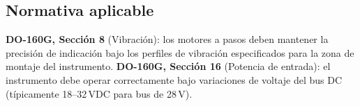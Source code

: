 \documentclass[11pt]{article}
\begin{document}
\subsection{Normativa aplicable}
\textbf{DO-160G, Sección 8} (Vibración): los motores a pasos deben mantener la precisión
de indicación bajo los perfiles de vibración especificados para la zona de montaje del
instrumento. \textbf{DO-160G, Sección 16} (Potencia de entrada): el instrumento debe
operar correctamente bajo variaciones de voltaje del bus DC (típicamente 18--32\,VDC
para bus de 28\,V).
\end{document}
